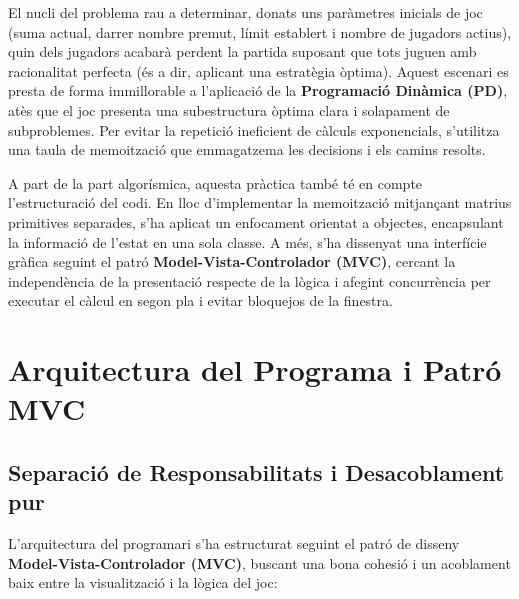 \documentclass[compsoc, a4paper]{IEEEtran}
\begin{document}
El nucli del problema rau a determinar, donats uns paràmetres inicials de joc (suma actual, darrer nombre premut, límit establert i nombre de jugadors actius), quin dels jugadors acabarà perdent la partida suposant que tots juguen amb racionalitat perfecta (és a dir, aplicant una estratègia òptima). Aquest escenari es presta de forma immillorable a l'aplicació de la \textbf{Programació Dinàmica (PD)}, atès que el joc presenta una subestructura òptima clara i solapament de subproblemes. Per evitar la repetició ineficient de càlculs exponencials, s'utilitza una taula de memoització que emmagatzema les decisions i els camins resolts.

A part de la part algorísmica, aquesta pràctica també té en compte l'estructuració del codi. En lloc d'implementar la memoització mitjançant matrius primitives separades, s'ha aplicat un enfocament orientat a objectes, encapsulant la informació de l'estat en una sola classe. A més, s'ha dissenyat una interfície gràfica seguint el patró \textbf{Model-Vista-Controlador (MVC)}, cercant la independència de la presentació respecte de la lògica i afegint concurrència per executar el càlcul en segon pla i evitar bloquejos de la finestra.

\section{Arquitectura del Programa i Patró MVC}

\subsection{Separació de Responsabilitats i Desacoblament pur}

L'arquitectura del programari s'ha estructurat seguint el patró de disseny \textbf{Model-Vista-Controlador (MVC)}, buscant una bona cohesió i un acoblament baix entre la visualització i la lògica del joc:
\end{document}

